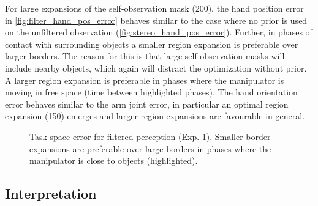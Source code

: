 For large expansions of the self-observation mask (200), the hand position error in \cref{fig:filter_hand_pos_error} behaves similar to the case where no prior is used on the unfiltered observation (\cref{fig:stereo_hand_pos_error}). Further, in phases of contact with surrounding objects a smaller region expansion is preferable over larger borders. The reason for this is that large self-observation masks will include nearby objects, which again will distract the optimization without prior. A larger region expansion is preferable in phases where the manipulator is moving in free space (time between highlighted phases).
The hand orientation error behaves similar to the arm joint error, in particular an optimal region expansion (150) emerges and larger region expansions are favourable in general.

\begin{figure}
\centering
{}
\caption[Task space error for filtered perception (Exp. 1)]{Task space error for filtered perception (Exp. 1). Smaller border expansions are preferable over large borders in phases where the manipulator is close to objects (highlighted).}
\label{fig:filter_pose_error}
\end{figure}


\subsection{Interpretation}

